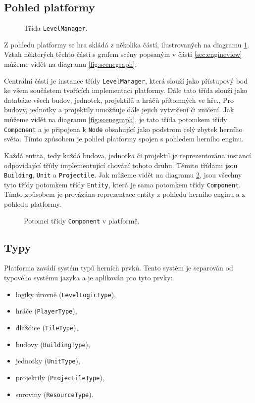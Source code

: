 \subsection{Pohled platformy}
\label{sec:platformimpl}

\begin{figure}[h]
	\centering
	\fontsize{8pt}{11pt}\selectfont
	\def\svgwidth{\textwidth}
	
	\caption{Třída \texttt{LevelManager}.}
	\label{fig:platform}
\end{figure}

Z pohledu platformy se hra skládá z několika částí, ilustrovaných na diagramu \ref{fig:platform}. Vztah některých těchto částí s grafem scény popsaným v části \ref{sec:engineview} můžeme vidět na diagramu \ref{fig:scenegraph}.

Centrální částí je instance třídy \texttt{LevelManager}, která slouží jako přístupový bod ke všem součástem tvořících implementaci platformy. Dále tato třída slouží jako databáze všech budov, jednotek, projektilů a hráčů přítomných ve hře., Pro budovy, jednotky a projektily umožňuje dále jejich vytvoření či zničení. Jak můžeme vidět na diagramu \ref{fig:scenegraph}, je tato třída potomkem třídy \texttt{Component} a je připojena k \texttt{Node} obsahující jako podstrom celý zbytek herního světa. Tímto způsobem je pohled platformy spojen s pohledem herního enginu.

Každá entita, tedy každá budova, jednotka či projektil je reprezentována instancí odpovídající třídy implementující chování tohoto druhu. Těmito třídami jsou \texttt{Building}, \texttt{Unit} a \texttt{Projectile}. Jak můžeme vidět na diagramu \ref{fig:componenthierarchy}, jsou všechny tyto třídy potomkem třídy \texttt{Entity}, která je sama potomkem třídy \texttt{Component}. Tímto způsobem je provázána reprezentace entity z pohledu herního enginu a z pohledu platformy. 


\begin{figure}[h]
	\centering
	\fontsize{9pt}{11pt}\selectfont
	\def\svgwidth{0.7\textwidth}
	
	\caption{Potomci třídy \texttt{Component} v platformě.}
	\label{fig:componenthierarchy}
\end{figure}

\subsection{Typy}
\label{sec:types}
Platforma zavádí systém typů herních prvků. Tento systém je separován od typového systému jazyka a je aplikován pro tyto prvky:
\begin{itemize}
	\item logiky úrovně (\texttt{LevelLogicType}),
	\item hráče (\texttt{PlayerType}),
	\item dlaždice (\texttt{TileType}),
	\item budovy (\texttt{BuildingType}),
	\item jednotky (\texttt{UnitType}),
	\item projektily (\texttt{ProjectileType}),
	\item suroviny (\texttt{ResourceType}).
\end{itemize}

